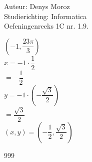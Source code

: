 \documentclass[a4paper]{article}
\begin{document}
\noindent \large Auteur: Denys Moroz\\
\noindent \large Studierichting: Informatica\\
\noindent \large Oefeningenreeks 1C nr. 1.9.\\

\medskip

\normalsize

$\left(-1, \dfrac{23\pi}{3}\right)$\\

$x = -1 \cdot \dfrac{1}{2}$\\

$= -\dfrac{1}{2}$\\

$y = -1 \cdot \left(-\dfrac{\sqrt{3}}{2}\right)$\\

$= \dfrac{\sqrt{3}}{2}$\\

$(x,y) = \left(-\dfrac{1}{2}, \dfrac{\sqrt{3}}{2}\right)$\\


\begin{thebibliography}{999}
\end{thebibliography}
\end{document}
